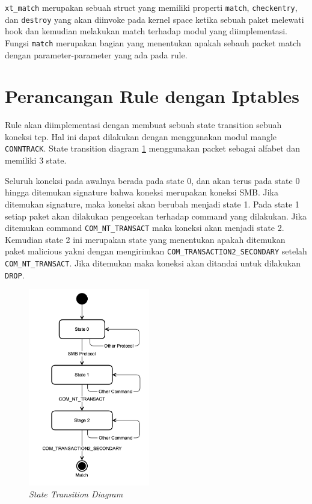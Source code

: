 \verb|xt_match| merupakan sebuah struct yang memiliki properti \verb|match|, \verb|checkentry|, dan \verb|destroy| yang akan diinvoke pada kernel space ketika sebuah paket melewati hook dan kemudian melakukan match terhadap modul yang diimplementasi. Fungsi \verb|match| merupakan bagian yang menentukan apakah sebauh packet match dengan parameter-parameter yang ada pada rule.

\section{Perancangan Rule dengan Iptables}

Rule akan diimplementasi dengan membuat sebuah state transition sebuah koneksi tcp. Hal ini dapat dilakukan dengan menggunakan modul mangle \verb|CONNTRACK|. State transition diagram \ref{fig:state_transition_diagram} menggunakan packet sebagai alfabet dan memiliki 3 state.

Seluruh koneksi pada awalnya berada pada state 0, dan akan terus pada state 0 hingga ditemukan signature bahwa koneksi merupakan koneksi SMB. Jika ditemukan signature, maka koneksi akan berubah menjadi state 1. Pada state 1 setiap paket akan dilakukan pengecekan terhadap command yang dilakukan. Jika ditemukan command \verb|COM_NT_TRANSACT| maka koneksi akan menjadi state 2. Kemudian state 2 ini merupakan state yang menentukan apakah ditemukan paket malicious yakni dengan mengirimkan \verb|COM_TRANSACTION2_SECONDARY| setelah \verb|COM_NT_TRANSACT|. Jika ditemukan maka koneksi akan ditandai untuk dilakukan \verb|DROP|.

\begin{figure}[H]
	\centering
	\includegraphics[width=200px]{resources/ngfilter_state_diagram.png}
	\caption{\textit{State Transition Diagram}}
	\label{fig:state_transition_diagram}
\end{figure}

